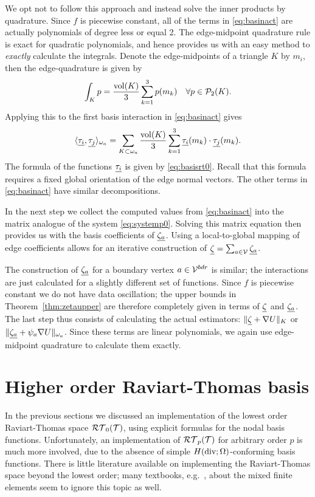 \documentclass[thesis.tex]{subfiles}
\begin{document}
  We opt not to follow this approach and instead solve the inner products by quadrature. Since  $f$ is piecewise constant, all of the
  terms in \eqref{eq:basinact} are actually polynomials of degree less or equal 2. 
  The edge-midpoint quadrature rule is exact for quadratic polynomials, and hence provides us with an easy
  method to \emph{exactly} calculate the integrals. 
  Denote the edge-midpoints of a triangle $K$ by $m_i$, then the edge-quadrature is given by
  \[
    \int_K p = \frac{\operatorname{vol}(K)}{3} \sum_{k=1}^3 p(m_k)\quad \forall p \in \mathcal{P}_2(K).
  \]
  Applying this to the first basis interaction in \eqref{eq:basinact} gives 
  \[
  \langle \underline{\tau_i}, \underline{\tau_j} \rangle_{\omega_a} = \sum_{K \subset \omega_a} \frac{\operatorname{vol}(K)}{3}\sum_{k=1}^3 \underline{\tau_i}(m_k) \cdot \underline{\tau_j}(m_k).
  \]
  The formula of the functions $\underline{\tau_i}$ is given by \eqref{eq:basisrt0}. Recall that this formula
  requires a fixed global orientation of the edge normal vectors.
  The other terms in \eqref{eq:basinact} have similar decompositions.
  
  In the next step we collect the computed values from \eqref{eq:basinact} into the matrix analogue of
  the system \eqref{eq:systemp0}. Solving this matrix equation then provides us with the basis coefficients of $\underline{\zeta_a}$.
  Using a local-to-global mapping of edge coefficients allows for an iterative construction of $\underline{\zeta} = \sum_{a \in \mathcal{V}} \underline{\zeta_a}$. 

  The construction of $\underline{\zeta_a}$ for a boundary vertex $a \in \mathcal{V}^{bdr}$ is similar; the interactions
  are just calculated for a slightly different set of functions. Since $f$ is piecewise constant
  we do not have data oscillation; the upper bounds in Theorem~\ref{thm:zetaupper} are
  therefore completely given in terms of $\underline{\zeta}$ and 
  $\underline{\zeta_a}$. The last step thus consists of calculating the actual estimators:
  $\| \underline{\zeta} + \nabla U \|_K$ or $\| \underline{\zeta_a} + \psi_a \nabla U \|_{\omega_a}$.
  Since these terms are linear polynomials, we again use edge-midpoint quadrature to calculate them exactly.
  
  \section{Higher order Raviart-Thomas basis}
  In the previous sections we discussed an implementation of the lowest order Raviart-Thomas space $\mathcal{RT}_0(\mathcal{T})$,
  using explicit formulas for the nodal basis functions.
  Unfortunately, an implementation of $\mathcal{RT}_p(\mathcal{T})$ for arbitrary order $p$ is much more involved, due to the absence
  of simple $H(\operatorname{div}; \Omega)$-conforming basis functions.
  There is little literature available on implementing the Raviart-Thomas space beyond the lowest
  order; many textbooks, e.g.~\cite{brezzimixed,braess2007finite, gaticasimple}, about the mixed finite elements seem to ignore this 
  topic as well.
\end{document}
